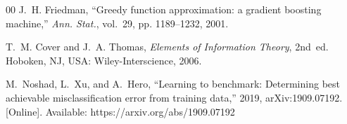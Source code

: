 \begin{thebibliography}{00}
J.~H. Friedman, ``Greedy function approximation: a gradient boosting
machine,'' \emph{Ann. Stat.}, vol.~29, pp. 1189--1232, 2001.

T.~M. Cover and J.~A. Thomas, \emph{Elements of Information Theory}, 2nd~ed.
Hoboken, NJ, USA: Wiley-Interscience, 2006.

M.~Noshad, L.~Xu, and A.~Hero, ``Learning to benchmark: Determining best
achievable misclassification error from training data,'' 2019,
arXiv:1909.07192. [Online]. Available: https://arxiv.org/abs/1909.07192

\end{thebibliography}



